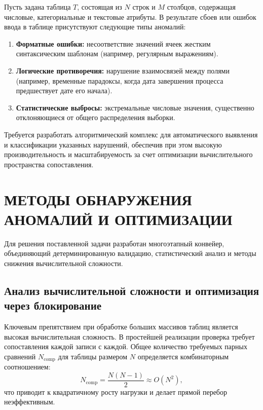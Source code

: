 \documentclass{misisarticle}
\begin{document}
Пусть задана таблица $T$, состоящая из $N$ строк и $M$ столбцов, содержащая числовые, категориальные и текстовые атрибуты. В результате сбоев или ошибок ввода в таблице присутствуют следующие типы аномалий:
\begin{enumerate}
    \item \textbf{Форматные ошибки:} несоответствие значений ячеек жестким синтаксическим шаблонам (например, регулярным выражениям).
    \item \textbf{Логические противоречия:} нарушение взаимосвязей между полями (например, временные парадоксы, когда дата завершения процесса предшествует дате его начала).
    \item \textbf{Статистические выбросы:} экстремальные числовые значения, существенно отклоняющиеся от общего распределения выборки.
\end{enumerate}

Требуется разработать алгоритмический комплекс для автоматического выявления и классификации указанных нарушений, обеспечив при этом высокую производительность и масштабируемость за счет оптимизации вычислительного пространства сопоставления.

\section{МЕТОДЫ ОБНАРУЖЕНИЯ АНОМАЛИЙ И ОПТИМИЗАЦИИ}

Для решения поставленной задачи разработан многоэтапный конвейер, объединяющий детерминированную валидацию, статистический анализ и методы снижения вычислительной сложности.

\subsection{Анализ вычислительной сложности и оптимизация через блокирование}
Ключевым препятствием при обработке больших массивов таблиц является высокая вычислительная сложность. В простейшей реализации проверка требует сопоставления каждой записи с каждой. Общее количество требуемых парных сравнений $N_{\text{comp}}$ для таблицы размером $N$ определяется комбинаторным соотношением:
\begin{equation}
N_{\text{comp}} = \frac{N(N - 1)}{2} \approx O(N^2),
\end{equation}
что приводит к квадратичному росту нагрузки и делает прямой перебор неэффективным.
\end{document}
